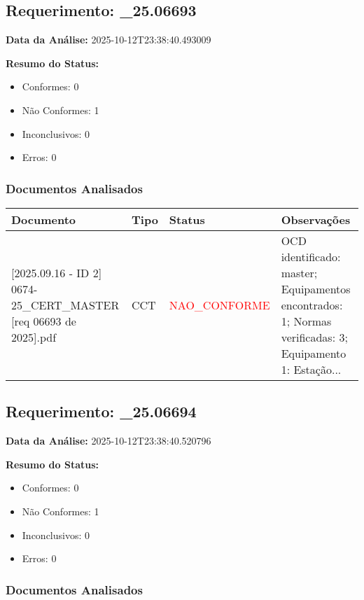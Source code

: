 \documentclass[12pt,a4paper]{article}
\begin{document}
\subsection{Requerimento: \_25.06693}

\textbf{Data da Análise:} 2025-10-12T23:38:40.493009

\textbf{Resumo do Status:}
\begin{itemize}
    \item Conformes: 0
    \item Não Conformes: 1
    \item Inconclusivos: 0
    \item Erros: 0
\end{itemize}

\subsubsection{Documentos Analisados}

\begin{longtable}{|p{4cm}|p{2cm}|p{2cm}|p{6cm}|}
\hline
\textbf{Documento} & \textbf{Tipo} & \textbf{Status} & \textbf{Observações} \\
\hline
\endhead
[Certificado de Conformidade Técnica - CCT][2025.09.16 - ID 2] 0674-25\_CERT\_MASTER [req 06693 de 2025].pdf & CCT & \textcolor{red}{NAO\_CONFORME} & OCD identificado: master; Equipamentos encontrados: 1; Normas verificadas: 3; Equipamento 1: Estação... \\
\hline
\end{longtable}


\subsection{Requerimento: \_25.06694}

\textbf{Data da Análise:} 2025-10-12T23:38:40.520796

\textbf{Resumo do Status:}
\begin{itemize}
    \item Conformes: 0
    \item Não Conformes: 1
    \item Inconclusivos: 0
    \item Erros: 0
\end{itemize}

\subsubsection{Documentos Analisados}
\end{document}
